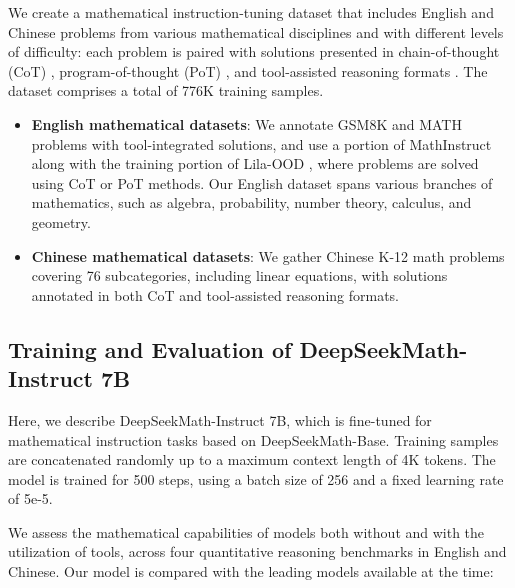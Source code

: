 We create a mathematical instruction-tuning dataset that includes English and Chinese problems from various mathematical disciplines and with different levels of difficulty: each problem is paired with solutions presented in chain-of-thought (CoT) \citep{cot}, program-of-thought (PoT) \citep{pot,pal}, and tool-assisted reasoning formats \citep{tora}. The dataset comprises a total of 776K training samples.

\begin{itemize}[topsep=0pt]
    \item \textbf{English mathematical datasets}: We annotate GSM8K and MATH problems with tool-integrated solutions, and use a portion of MathInstruct \citep{MathInstruct} along with the training portion of Lila-OOD \citep{lila}, where problems are solved using CoT or PoT methods. Our English dataset spans various branches of mathematics, such as algebra, probability, number theory, calculus, and geometry.
    \item \textbf{Chinese mathematical datasets}: We gather Chinese K-12 math problems covering 76 subcategories, including linear equations, with solutions annotated in both CoT and tool-assisted reasoning formats.
\end{itemize}

\subsection{Training and Evaluation of DeepSeekMath-Instruct 7B}

Here, we describe DeepSeekMath-Instruct 7B, which is fine-tuned for mathematical instruction tasks based on DeepSeekMath-Base. Training samples are concatenated randomly up to a maximum context length of 4K tokens. The model is trained for 500 steps, using a batch size of 256 and a fixed learning rate of 5e-5.

We assess the mathematical capabilities of models both without and with the utilization of tools, across four quantitative reasoning benchmarks in English and Chinese. Our model is compared with the leading models available at the time:

